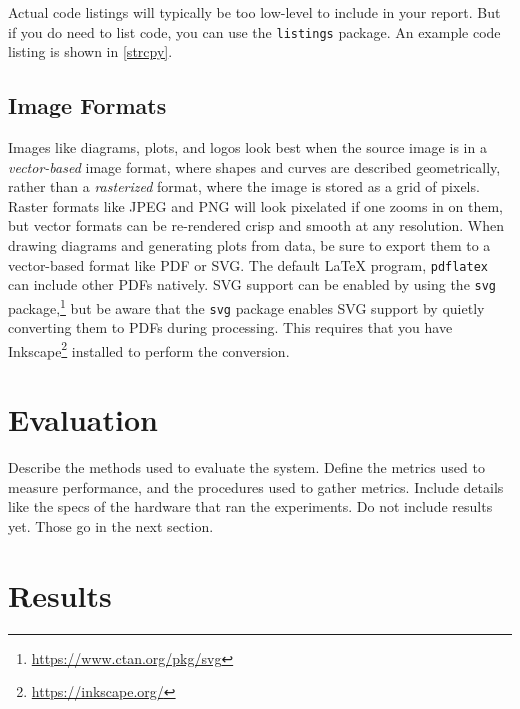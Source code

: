 \documentclass[
	conference,	%
]{IEEEtran}
\newcommand{\newterm}[1]{\textit{#1}}
\begin{document}
Actual code listings will typically be too low-level to include in your report.
But if you do need to list code, you can use the \lstinline!listings! package.
An example code listing is shown in \autoref{strcpy}.


\subsection{Image Formats}
\label{imageformats}

Images like diagrams, plots, and logos
look best when the source image is in a
\newterm{vector-based} image format,
where shapes and curves are described geometrically,
rather than a \newterm{rasterized} format,
where the image is stored as a grid of pixels.
Raster formats like JPEG and PNG will look pixelated if one zooms in on them,
but vector formats can be re-rendered crisp and smooth at any resolution.
When drawing diagrams and generating plots from data,
be sure to export them to a vector-based format like PDF or SVG.
The default {\LaTeX} program,
\lstinline!pdflatex!
can include other PDFs natively.
SVG support can be enabled by using the
\lstinline!svg! package,\footnote{\url{https://www.ctan.org/pkg/svg}}
but be aware that the \lstinline!svg! package
enables SVG support by quietly converting them to PDFs during processing.
This requires that you have
Inkscape\footnote{\url{https://inkscape.org/}}
installed to perform the conversion.


\section{Evaluation}
\label{evaluation}

Describe the methods used to evaluate the system.
Define the metrics used to measure performance,
and the procedures used to gather metrics.
Include details like the specs of the hardware that ran the experiments.
Do not include results yet.
Those go in the next section.


\section{Results}
\label{results}
\end{document}

